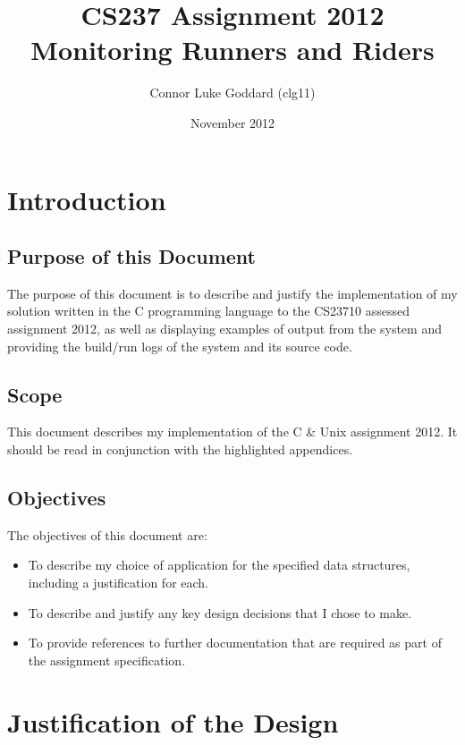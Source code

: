 \documentclass{article}
\title{CS237 Assignment 2012 \\
 Monitoring Runners and Riders}
\author{Connor Luke Goddard (clg11)}
\date{November 2012}
\begin{document}
\maketitle
\clearpage

\tableofcontents
\clearpage


\section{Introduction}

\subsection{Purpose of this Document}
The purpose of this document is to describe and justify the implementation of my solution written in the C programming language to the CS23710 assessed assignment 2012, as well as displaying examples of output from the system and providing the build/run logs of the system and its source code.

\subsection{Scope}
This document describes my implementation of the C \& Unix assignment 2012. It should be read in conjunction with the highlighted appendices.

\subsection{Objectives}

The objectives of this document are:

\begin{itemize}

\item To describe my choice of application for the specified data structures, including a justification for each.

\item To describe and justify any key design decisions that I chose to make.

\item To provide references to further documentation that are required as part of the assignment specification.

\end{itemize}

\clearpage 
\section{Justification of the Design}
\end{document}
